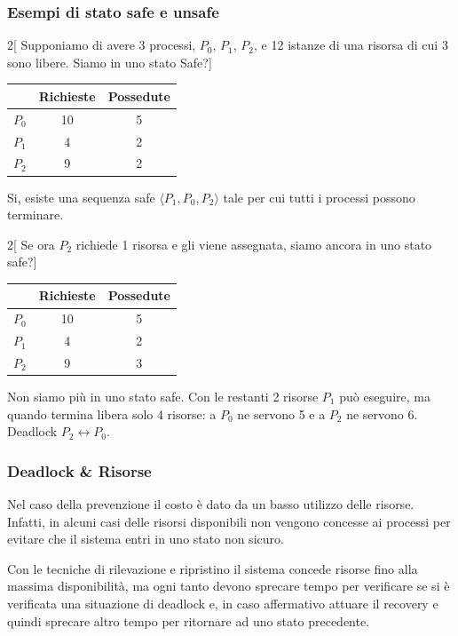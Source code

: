 \documentclass[a4paper,12pt, twoside]{report}
\begin{document}
\subsubsection{Esempi di stato safe e unsafe}
\begin{multicols}{2}[
Supponiamo di avere 3 processi, $P_0$, $P_1$, $P_2$, e 12 istanze di una risorsa di cui 3 sono libere. Siamo in uno stato Safe?]
\begin{center}
\begin{tabular} {| c | c | c |}
\hline
& Richieste & Possedute \\
\hline
\hline
$P_0$ & 10 & 5 \\
$P_1$ & 4 & 2 \\
$P_2$ & 9 & 2 \\
\hline
\end{tabular}
\end{center}

Si, esiste una sequenza safe $\langle P_1, P_0, P_2 \rangle$ tale per cui tutti i processi possono terminare.
\end{multicols}
\begin{multicols}{2}[
Se ora $P_2$ richiede 1 risorsa e gli viene assegnata, siamo ancora in uno stato safe?]
\begin{center}
\begin{tabular} {| c | c | c |}
\hline
& Richieste & Possedute \\
\hline
\hline
$P_0$ & 10 & 5 \\
$P_1$ & 4 & 2 \\
$P_2$ & 9 & 3 \\
 \hline
\end{tabular}
\end{center}
Non siamo pi\`u in uno stato safe. Con le restanti 2 risorse $P_1$ pu\`o eseguire, ma quando termina libera solo 4 risorse: a $P_0$ ne servono 5 e a $P_2$ ne servono 6. Deadlock $P_2 \leftrightarrow P_0$.
\end{multicols}


\subsubsection{Deadlock \& Risorse}

Nel caso della prevenzione il costo \`e dato da un basso utilizzo delle risorse. Infatti, in alcuni casi delle risorsi disponibili non vengono concesse ai processi per evitare che il sistema entri in uno stato non sicuro.

Con le tecniche di rilevazione e ripristino il sistema concede risorse fino alla massima disponibilit\`a, ma ogni tanto devono sprecare tempo per verificare se si \`e verificata una situazione di deadlock e, in caso affermativo attuare il recovery e quindi sprecare altro tempo per ritornare ad uno stato precedente.
\end{document}
